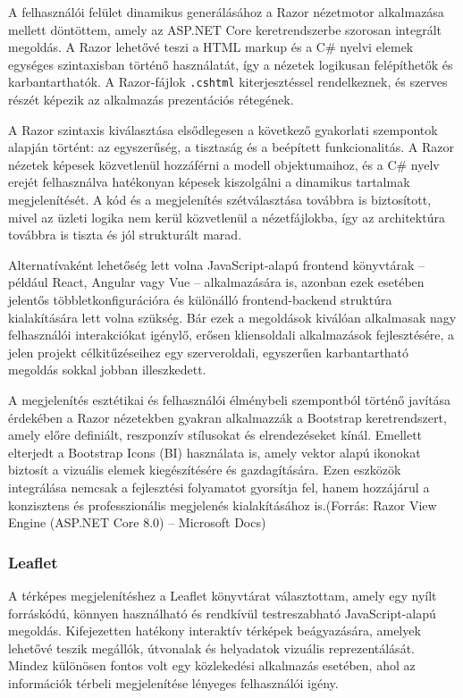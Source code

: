 \indent A felhasználói felület dinamikus generálásához a Razor nézetmotor alkalmazása mellett döntöttem, amely az ASP.NET Core keretrendszerbe szorosan integrált megoldás. A Razor lehetővé teszi a HTML markup és a C\# nyelvi elemek egységes szintaxisban történő használatát, így a nézetek logikusan felépíthetők és karbantarthatók. A Razor-fájlok \texttt{.cshtml} kiterjesztéssel rendelkeznek, és szerves részét képezik az alkalmazás prezentációs rétegének.

A Razor szintaxis kiválasztása elsődlegesen a következő gyakorlati szempontok alapján történt: az egyszerűség, a tisztaság és a beépített funkcionalitás. A Razor nézetek képesek közvetlenül hozzáférni a modell objektumaihoz, és a C\# nyelv erejét felhasználva hatékonyan képesek kiszolgálni a dinamikus tartalmak megjelenítését. A kód és a megjelenítés szétválasztása továbbra is biztosított, mivel az üzleti logika nem kerül közvetlenül a nézetfájlokba, így az architektúra továbbra is tiszta és jól strukturált marad.

Alternatívaként lehetőség lett volna JavaScript-alapú frontend könyvtárak – például React, Angular vagy Vue – alkalmazására is, azonban ezek esetében jelentős többletkonfigurációra és különálló frontend-backend struktúra kialakítására lett volna szükség. Bár ezek a megoldások kiválóan alkalmasak nagy felhasználói interakciókat igénylő, erősen kliensoldali alkalmazások fejlesztésére, a jelen projekt célkitűzéseihez egy szerveroldali, egyszerűen karbantartható megoldás sokkal jobban illeszkedett.


\indent A megjelenítés esztétikai és felhasználói élménybeli szempontból történő javítása érdekében a Razor nézetekben gyakran alkalmazzák a Bootstrap keretrendszert, amely előre definiált, reszponzív stílusokat és elrendezéseket kínál. Emellett elterjedt a Bootstrap Icons (BI) használata is, amely vektor alapú ikonokat biztosít a vizuális elemek kiegészítésére és gazdagítására. Ezen eszközök integrálása nemcsak a fejlesztési folyamatot gyorsítja fel, hanem hozzájárul a konzisztens és professzionális megjelenés kialakításához is.(Forrás: Razor View Engine (ASP.NET Core 8.0) – Microsoft Docs)

\subsubsection{Leaflet}

\indent A térképes megjelenítéshez a Leaflet könyvtárat választottam, amely egy nyílt forráskódú, könnyen használható és rendkívül testreszabható JavaScript-alapú megoldás. Kifejezetten hatékony interaktív térképek beágyazására, amelyek lehetővé teszik megállók, útvonalak és helyadatok vizuális reprezentálását. Mindez különösen fontos volt egy közlekedési alkalmazás esetében, ahol az információk térbeli megjelenítése lényeges felhasználói igény.

